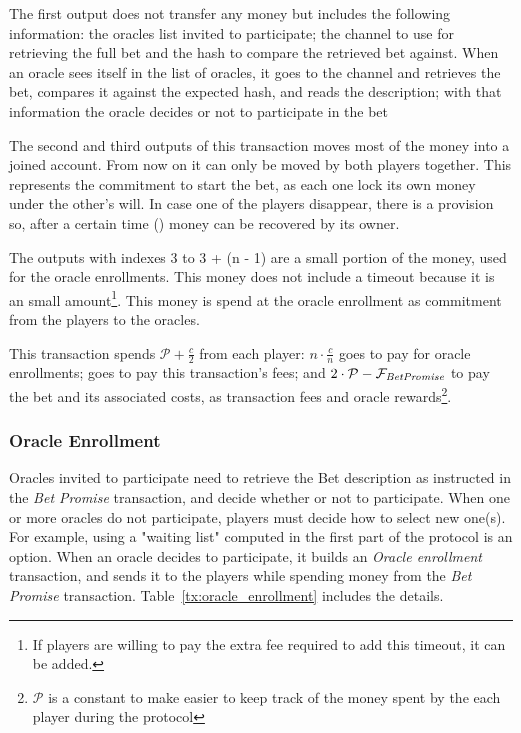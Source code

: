The first output does not transfer any money but includes the following
  information: the oracles list invited to participate; the channel to use for
  retrieving the full bet and the hash to compare the retrieved bet against.
When an oracle sees itself in the list of oracles, it goes to the channel and
  retrieves the bet, compares it against the expected hash, and reads the
  description; with that information the oracle decides or not to participate
  in the bet

The second and third outputs of this transaction moves most of the money into
  a joined account. From now on it can only be moved by both players
  together.
This represents the commitment to start the bet, as each one lock its own money
  under the other's will.
In case one of the players disappear, there is a provision so, after a certain
  time () money can be recovered by its owner.

The outputs with indexes 3 to 3 + (n - 1) are a small portion of the money, used
  for the oracle enrollments.
This money does not include a timeout because it is an small amount\footnote{If
  players are willing to pay the extra fee required to add this timeout, it can
  be added.}.
This money is spend at the oracle enrollment as commitment from the players to
  the oracles.

This transaction spends $\mathcal{P} + \frac{c}{2}$ from each player:
  $ n \cdot \frac{c}{n}$ goes to pay for oracle enrollments; 
  goes to pay this transaction's fees; and
  $2 \cdot \mathcal{P} - \mathcal{F}_{\mathit{Bet Promise}}$ to pay the bet and its associated
  costs, as transaction fees and oracle rewards\footnote{$\mathcal{P}$ is a
  constant to make easier to keep track of the money spent by the each player
  during the protocol}.

\subsubsection{Oracle Enrollment}
Oracles invited to participate need to retrieve the Bet description as
  instructed in the \textit{Bet Promise} transaction, and decide whether or not
  to participate.
When one or more oracles do not participate, players must decide how to select
  new one(s).
For example, using a "waiting list" computed in the first part of the protocol
  is an option.
When an oracle decides to participate, it builds an \textit{Oracle enrollment}
  transaction, and sends it to the players while spending money from the
  \textit{Bet Promise} transaction. Table~\ref{tx:oracle_enrollment} includes
  the details.

